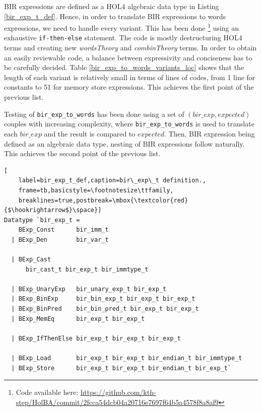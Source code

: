 \documentclass{kththesis}
\begin{document}
BIR expressions are defined as a HOL4 algebraic data type in Listing \ref{bir_exp_t_def}. Hence, in order to translate BIR expressions to words expressions, we need to handle every variant. This has been done \footnote{Code available here: \url{https://github.com/kth-step/HolBA/commit/2fcca54dcb04a20716e7697f64b5a4578f8a8af9}} using an exhaustive \texttt{if-then-else} statement\footnotemark. The code is mostly destructuring HOL4 terms and creating new \textit{wordsTheory} and \textit{combinTheory} terms. In order to obtain an easily reviewable code, a balance between expressivity and conciseness has to be carefully decided. Table \ref{bir_exp_to_words_variants_loc} shows that the length of each variant is relatively small in terms of lines of codes, from 1 line for constants to 51 for memory store expressions. This achieves the first point of the previous list.


Testing of \texttt{bir\_exp\_to\_words} has been done using a set of $(bir\_exp,expected)$ couples with increasing complexity, where \texttt{bir\_exp\_to\_words} is used to translate each $bir\_exp$ and the result is compared to $expected$. Then, BIR expression being defined as an algebraic data type, nesting of BIR expressions follow naturally. This achieves the second point of the previous list.

\begin{lstlisting}[
    label=bir_exp_t_def,caption=bir\_exp\_t definition.,
    frame=tb,basicstyle=\footnotesize\ttfamily,
    breaklines=true,postbreak=\mbox{\textcolor{red}{$\hookrightarrow$}\space}]
Datatype `bir_exp_t =
    BExp_Const      bir_imm_t
  | BExp_Den        bir_var_t

  | BExp_Cast
  	  bir_cast_t bir_exp_t bir_immtype_t

  | BExp_UnaryExp   bir_unary_exp_t bir_exp_t
  | BExp_BinExp     bir_bin_exp_t bir_exp_t bir_exp_t
  | BExp_BinPred    bir_bin_pred_t bir_exp_t bir_exp_t
  | BExp_MemEq      bir_exp_t bir_exp_t

  | BExp_IfThenElse bir_exp_t bir_exp_t bir_exp_t

  | BExp_Load       bir_exp_t bir_exp_t bir_endian_t bir_immtype_t
  | BExp_Store      bir_exp_t bir_exp_t bir_endian_t bir_exp_t`
\end{lstlisting}
\end{document}

